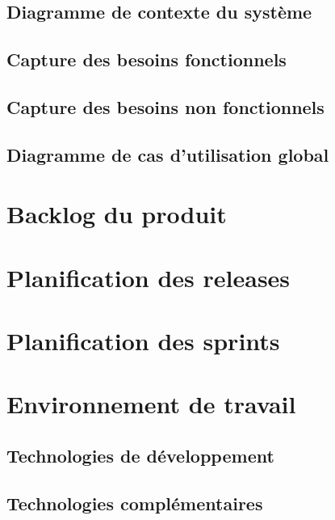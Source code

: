 \subsection{Diagramme de contexte du système}

\subsection{Capture des besoins fonctionnels}


\subsection{Capture des besoins non fonctionnels}


\subsection{Diagramme de cas d'utilisation global}

\section{Backlog du produit}


\section{Planification des releases}


\section{Planification des sprints}


\section{Environnement de travail}
\subsection{Technologies de développement}


\subsection{Technologies complémentaires}



